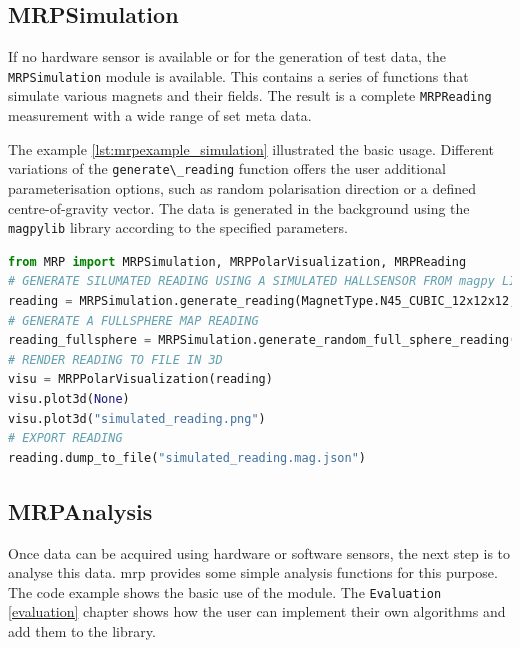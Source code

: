 \hypertarget{mrpsimulation}{%
\subsection{MRPSimulation}\label{mrpsimulation}}

If no hardware sensor is available or for the generation of test data,
the \passthrough{\lstinline!MRPSimulation!} module is available. This
contains a series of functions that simulate various magnets and their
fields. The result is a complete \passthrough{\lstinline!MRPReading!}
measurement with a wide range of set meta data.

The example \ref{lst:mrpexample_simulation} illustrated the basic usage.
Different variations of the \passthrough{\lstinline!generate\_reading!}
function offers the user additional parameterisation options, such as
random polarisation direction or a defined centre-of-gravity vector. The
data is generated in the background using the
\passthrough{\lstinline!magpylib!} \cite{ortner2020magpylib} library
according to the specified parameters.

\begin{lstlisting}[language=Python, caption={MRPSimulation example illustrates the usage of several data analysis functions}, label=lst:mrpexample_simulation]
from MRP import MRPSimulation, MRPPolarVisualization, MRPReading
# GENERATE SILUMATED READING USING A SIMULATED HALLSENSOR FROM magpy LIBRARY
reading = MRPSimulation.generate_reading(MagnetType.N45_CUBIC_12x12x12,_add_random_polarisation=True)
# GENERATE A FULLSPHERE MAP READING
reading_fullsphere = MRPSimulation.generate_random_full_sphere_reading()
# RENDER READING TO FILE IN 3D
visu = MRPPolarVisualization(reading)
visu.plot3d(None)
visu.plot3d("simulated_reading.png")
# EXPORT READING
reading.dump_to_file("simulated_reading.mag.json")
\end{lstlisting}

\hypertarget{mrpanalysis}{%
\subsection{MRPAnalysis}\label{mrpanalysis}}

Once data can be acquired using hardware or software sensors, the next
step is to analyse this data. \gls{mrp} provides some simple analysis
functions for this purpose. The code example shows the basic use of the
module. The \passthrough{\lstinline!Evaluation!} \ref{evaluation}
chapter shows how the user can implement their own algorithms and add
them to the library.

